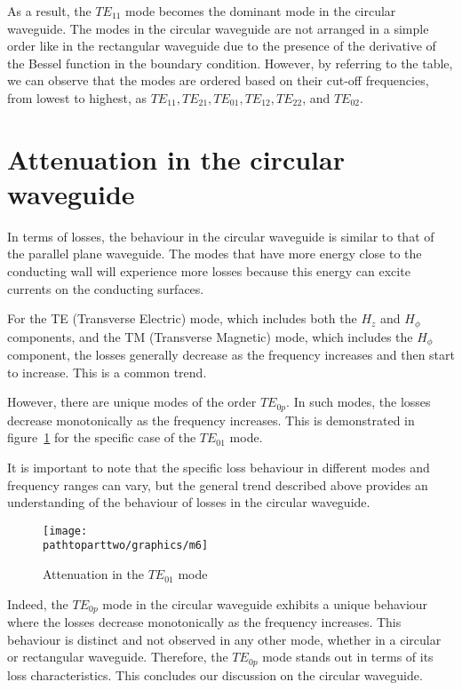 As a result, the $TE_{11}$ mode becomes the dominant mode in the circular waveguide. The modes in the circular waveguide are not arranged in a simple order like in the rectangular waveguide due to the presence of the derivative of the Bessel function in the boundary condition. However, by referring to the table, we can observe that the modes are ordered based on their cut-off frequencies, from lowest to highest, as $TE_{11}, TE_{21}, TE_{01}, TE_{12}, TE_{22}$, and $TE_{02}$.

\section{Attenuation in the circular waveguide}
In terms of losses, the behaviour in the circular waveguide is similar to that of the parallel plane waveguide. The modes that have more energy close to the conducting wall will experience more losses because this energy can excite currents on the conducting surfaces. 

For the TE (Transverse Electric) mode, which includes both the $H_z$ and $H_\phi$ components, and the TM (Transverse Magnetic) mode, which includes the $H_\phi$ component, the losses generally decrease as the frequency increases and then start to increase. This is a common trend. 

However, there are unique modes of the order $TE_{0p}$. In such modes, the losses decrease monotonically as the frequency increases. This is demonstrated in figure~\ref{fig:m6} for the specific case of the $TE_{01}$ mode.

It is important to note that the specific loss behaviour in different modes and frequency ranges can vary, but the general trend described above provides an understanding of the behaviour of losses in the circular waveguide.
\begin{figure}[h]
\centering
\texttt{[image: \\pathtoparttwo/graphics/m6]}
\caption{Attenuation in the $TE_{01}$ mode}
\label{fig:m6}
\end{figure}

Indeed, the $TE_{0p}$ mode in the circular waveguide exhibits a unique behaviour where the losses decrease monotonically as the frequency increases. This behaviour is distinct and not observed in any other mode, whether in a circular or rectangular waveguide. Therefore, the $TE_{0p}$ mode stands out in terms of its loss characteristics. This concludes our discussion on the circular waveguide.
